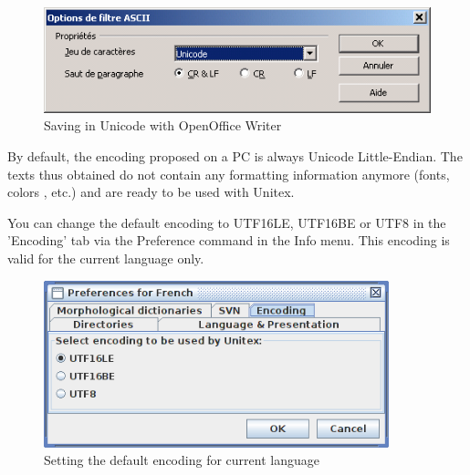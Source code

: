 \begin{figure}[!ht]
\begin{center}
\includegraphics[width=12.5cm]{resources/img/fig2-4.png}
\caption{\label{OfficeWriter}Saving in Unicode with OpenOffice Writer}
\end{center}
\end{figure}

\noindent By default, the encoding proposed on a PC is always Unicode
Little-Endian. The texts thus obtained do not contain any formatting information anymore (fonts,
colors , etc.) and are ready to be used with Unitex.

\bigskip
\noindent 
You can change the default encoding to UTF16LE, UTF16BE or UTF8 in the 'Encoding' tab via the Preference  command in the Info menu. This encoding is valid for the current language only.

\begin{figure}[!ht]
\begin{center}
\includegraphics[width=10cm]{resources/img/fig2-5.png}
\caption{\label{OfficeWriter}Setting the default encoding for current language}
\end{center}
\end{figure}

